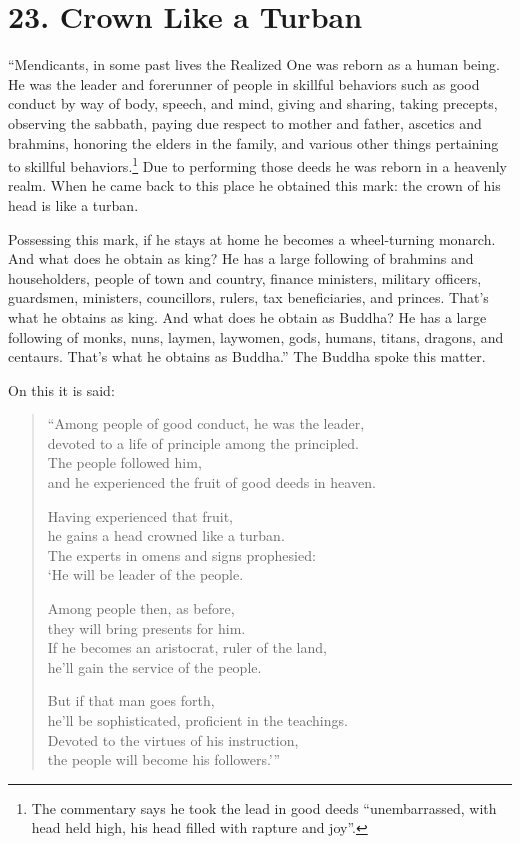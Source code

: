 \documentclass[12pt,openany]{book}%
\begin{document}
\section*{23. Crown Like a Turban }

“Mendicants, in some past lives the Realized One was reborn as a human being. He was the leader and forerunner of people in skillful behaviors such as good conduct by way of body, speech, and mind, giving and sharing, taking precepts, observing the sabbath, paying due respect to mother and father, ascetics and brahmins, honoring the elders in the family, and various other things pertaining to skillful behaviors.\footnote{The commentary says he took the lead in good deeds “unembarrassed, with head held high, his head filled with rapture and joy”. } Due to performing those deeds he was reborn in a heavenly realm. When he came back to this place he obtained this mark: the crown of his head is like a turban. 

Possessing this mark, if he stays at home he becomes a wheel-turning monarch. And what does he obtain as king? He has a large following of brahmins and householders, people of town and country, finance ministers, military officers, guardsmen, ministers, councillors, rulers, tax beneficiaries, and princes. That’s what he obtains as king. And what does he obtain as Buddha? He has a large following of monks, nuns, laymen, laywomen, gods, humans, titans, dragons, and centaurs. That’s what he obtains as Buddha.” The Buddha spoke this matter. 

On this it is said: 

\begin{verse}%
“Among people of good conduct, he was the leader, \\
devoted to a life of principle among the principled. \\
The people followed him, \\
and he experienced the fruit of good deeds in heaven. 

Having experienced that fruit, \\
he gains a head crowned like a turban. \\
The experts in omens and signs prophesied: \\
‘He will be leader of the people. 

Among people then, as before, \\
they will bring presents for him. \\
If he becomes an aristocrat, ruler of the land, \\
he’ll gain the service of the people. 

But if that man goes forth, \\
he’ll be sophisticated, proficient in the teachings. \\
Devoted to the virtues of his instruction, \\
the people will become his followers.’” 

%
\end{verse}
\end{document}
